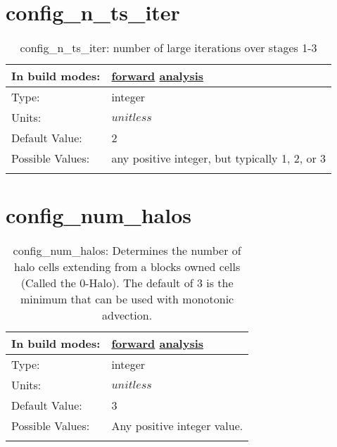 \section[config\_n\_ts\_iter]{config\_n\_ts\_iter}
\label{sec:nm_sec_config_n_ts_iter}
\begin{center}
\begin{longtable}{| p{2.0in} || p{4.0in} |}
    \hline
    In build modes: & \hyperref[subsec:forward_nm_tab_split_explicit_ts]{forward} \hyperref[subsec:analysis_nm_tab_split_explicit_ts]{analysis} \\
    \hline
    Type: & integer \\
    \hline
    Units: & $unitless$ \\
    \hline
    Default Value: & 2 \\
    \hline
    Possible Values: & any positive integer, but typically 1, 2, or 3 \\
    \hline
    \caption{config\_n\_ts\_iter: number of large iterations over stages 1-3}
\end{longtable}
\end{center}
\section[config\_num\_halos]{config\_num\_halos}
\label{sec:nm_sec_config_num_halos}
\begin{center}
\begin{longtable}{| p{2.0in} || p{4.0in} |}
    \hline
    In build modes: & \hyperref[subsec:forward_nm_tab_decomposition]{forward} \hyperref[subsec:analysis_nm_tab_decomposition]{analysis} \\
    \hline
    Type: & integer \\
    \hline
    Units: & $unitless$ \\
    \hline
    Default Value: & 3 \\
    \hline
    Possible Values: & Any positive integer value. \\
    \hline
    \caption{config\_num\_halos: Determines the number of halo cells extending from a blocks owned cells (Called the 0-Halo). The default of 3 is the minimum that can be used with monotonic advection.}
\end{longtable}
\end{center}
